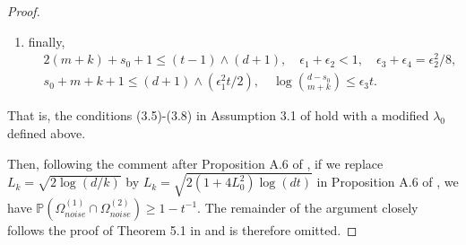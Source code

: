 \documentclass[aos,preprint]{imsart}
\theoremstyle{plain}
\theoremstyle{definition}
\newcommand{\bd}[1]{\boldsymbol{#1}}
\newcommand{\hbtheta}{\widehat{\boldsymbol{\theta}}}
\newcommand{\bX}{\boldsymbol{X}}
\newcommand{\ltheta}{\hbtheta^{\textup{Lasso}}}
\newcommand{\bepsilon}{\bd{\epsilon}}
\newcommand{\Pro}{\mathbb{P}}
\begin{document}
\begin{appendix}
\begin{proof}
\begin{enumerate}[label=\roman*)]
\item finally,
\begin{align*}
    &2(m+k)+s_0+1\le (t-1)\wedge (d+1), \quad
    \epsilon_1+\epsilon_2<1, \quad\epsilon_3+\epsilon_4=\epsilon_2^2/8, \\
    & s_0+m+k+1\le (d+1)\wedge (\epsilon_1^2 t/2), \quad \log\binom{d-s_0}{m+k}\le \epsilon_3 t.
\end{align*}
\end{enumerate}
That is, the conditions (3.5)-(3.8) in Assumption 3.1 of \cite{bellec2022biasing} hold with a modified $\lambda_0$ defined above. 

Then, following the comment after Proposition A.6 of \cite{bellec2022biasing}, if we replace $L_k = \sqrt{2\log (d/k)}$ by $L_k = \sqrt{2(1+4L_0^2) \log (dt)}$ in Proposition A.6 of \cite{bellec2022biasing}, we have $\Pro\left(\Omega_{noise}^{(1)}\cap \Omega_{noise}^{(2)}\right) \geq 1- t^{-1}$. The remainder of the argument closely follows the proof of Theorem 5.1 in \cite{bellec2022biasing} and is therefore omitted.
\end{proof}

\end{appendix}
\end{document}
